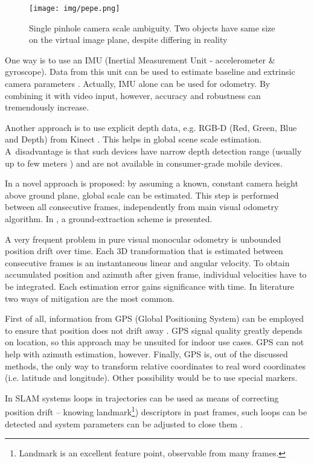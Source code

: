 \begin{figure}[ht]
	\centering\texttt{[image: img/pepe.png]}
	\caption{Single pinhole camera scale ambiguity. Two objects have same size on the virtual image plane, despite differing in reality}
	\label{fig:pepe}
\end{figure}

One way is to use an IMU (Inertial Measurement Unit - accelerometer \& gyroscope). Data from this unit can be used to estimate baseline and extrinsic camera parameters \cite{tracked_vehicles}. Actually, IMU alone can be used for odometry. By combining it with video input, however, accuracy and robustness can tremendously increase.

Another approach is to use explicit depth data, e.g. RGB-D (Red, Green, Blue and Depth) from Kinect \cite{yu2013improved}. This helps in global scene scale estimation. A~disadvantage is that such devices have narrow depth detection range (usually up to few meters \cite{accuracy_and_resoulution}) and are not available in consumer-grade mobile devices.

In \cite{robust_scale} a novel approach is proposed: by assuming a known, constant camera height above ground plane, global scale can be estimated. This step is performed between all consecutive frames, independently from main visual odometry algorithm. In \cite{xiao2015novel}, a ground-extraction scheme is presented.

A very frequent problem in pure visual monocular odometry is unbounded position drift over time. Each 3D transformation that is estimated between consecutive frames is an instantaneous linear and angular velocity. To obtain accumulated position and azimuth after given frame, individual velocities have to be integrated. Each estimation error gains significance with time. In literature two ways of mitigation are the most common.

First of all, information from GPS (Global Positioning System) can be employed to ensure that position does not drift away \cite{accurate_global_localization}. GPS signal quality greatly depends on location, so this approach may be unsuited for indoor use cases. GPS can not help with azimuth estimation, however. Finally, GPS is, out of the discussed methods, the only way to transform relative coordinates to real word coordinates (i.e. latitude and longitude). Other possibility would be to use special markers.


In SLAM systems loops in trajectories can be used as means of correcting position drift -- knowing landmark\footnote{Landmark is an excellent feature point, observable from many frames.}) descriptors in past frames, such loops can be detected and system parameters can be adjusted to close them \cite{the_application_of_kalman} \cite{monoslam}.



